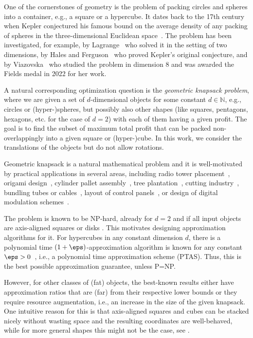 \documentclass[10pt,a4paper]{article}
\theoremstyle{plain}
\theoremstyle{plain}
\theoremstyle{plain}
\theoremstyle{definition}
\newcommand{\ari}[1]{#1}
\newcommand{\agtwo}[1]{#1}
\begin{document}
\label{sec:intro} One of the cornerstones of geometry is the problem
of packing circles and spheres into a container, e.g., a square or
a hypercube. It dates back to the 17th century when Kepler conjectured
his famous bound on the average density of any packing of spheres
in the three-dimensional Euclidean space~\cite{kepler2010six}. The problem has been investigated, for example, by Lagrange~\cite{chang2010simple}
who solved it in the setting of two dimensions, by Hales and Ferguson~\cite{hales2006formulation}
who proved Kepler's original conjecture, and by Viazovska~\cite{viazovska2017sphere}
who studied the problem in dimension $8$ and was awarded the Fields
medal in 2022 for her work.

A natural corresponding optimization question is the \emph{geometric
knapsack problem}, where we are given a set of $d$-dimensional objects
for some constant $d\in\mathbb{N}$, e.g., circles or \mbox{(hyper-)}spheres,
but possibly also other shapes (like squares, pentagons, hexagons,
etc. for the case of $d=2$) \agtwo{with} each of them having a given profit. The goal is to find the
subset of maximum total profit that can be packed non-overlappingly
into a given square or (hyper-)cube. \agtwo{In this work, we consider the translations of the objects but do not allow rotations.} 

Geometric knapsack is a natural mathematical problem and it is well-motivated
by practical applications in several areas, including radio tower
placement~\cite{szabo2007new}, origami design~\cite{lang1996computational},
cylinder pallet assembly~\cite{castillo2008solving,fraser1994integrated},
tree plantation~\cite{szabo2007new}, cutting industry~\cite{szabo2007new},
bundling tubes or cables~\cite{wang2002improved}, layout of control
panels~\cite{castillo2008solving}, or design of digital modulation
schemes~\cite{peikert1992packing}.

The problem is known to be \textsf{NP}-hard, already for $d=2$ and
if all input objects are \ari{axis-aligned} squares or disks \cite{demaine-Origami-NPHard,adamaszek2016hardness}.
This motivates designing approximation algorithms for it. For hypercubes
in any constant dimension $d$, there is a polynomial time $(1+\eps)$-approximation
algorithm is known for any constant $\eps>0$~\cite{Jansen0LS22}, i.e.,
a polynomial time approximation scheme (\textsf{PTAS}). Thus, this is the best
possible approximation guarantee, unless \textsf{P}=\textsf{NP}.

However, for other classes of (fat) objects, the best-known results
either have approximation ratios that are (far) from their respective lower
bounds or they require resource augmentation, i.e., an increase in the
size of the given knapsack. One intuitive reason for this is that
\ari{axis-aligned} squares and cubes can be stacked nicely without wasting space and
the resulting coordinates are well-behaved, while for more general
shapes this might not be the case, see . %
\end{document}
